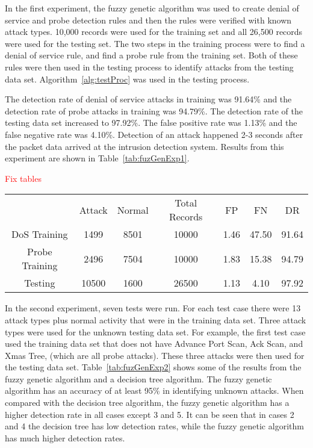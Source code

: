 \documentclass{sig-alternate}
\newcommand{\mycomment}[1]{\textcolor{red}{#1}}
\begin{document}
In the first experiment, the fuzzy genetic algorithm was used to create denial of service and probe detection rules and then the rules were verified with known attack types. 10,000 records were used for the training set and all 26,500 records were used for the testing set. The two steps in the training process were to find a denial of service rule, and find a probe rule from the training set. Both of these rules were then used in the testing process to identify attacks from the testing data set. Algorithm~\ref{alg:testProc} was used in the testing process.

\begin{algorithm}
\caption{}
\label{alg:testProc}
\begin{algorithmic}
\ELSE {}
\ENDIF
\end{algorithmic}
\end{algorithm}

The detection rate of denial of service attacks in training was 91.64\% and the detection rate of probe attacks in training was 94.79\%. The detection rate of the testing data set increased to 97.92\%. The false positive rate was 1.13\% and the false negative rate was 4.10\%. Detection of an attack happened 2-3 seconds after the packet data arrived at the intrusion detection system. Results from this experiment are shown in Table~\ref{tab:fuzGenExp1}.

\mycomment{Fix tables}

\begin{table*}
\caption{Results from Experiment 1}
\begin{tabular}{|ccccccc|} \hline
 & Attack & Normal & Total Records & FP & FN & DR\\
DoS Training & 1499 & 8501 & 10000 & 1.46 & 47.50 & 91.64\\
Probe Training & 2496 & 7504 & 10000 & 1.83 & 15.38 & 94.79\\
Testing & 10500 & 1600 & 26500 & 1.13 & 4.10 & 97.92\\
\hline\end{tabular}
\label{tab:fuzGenExp1}
\end{table*}

In the second experiment, seven tests were run. For each test case there were 13 attack types plus normal activity that were in the training data set. Three attack types were used for the unknown testing data set. For example, the first test case used the training data set that does not have Advance Port Scan, Ack Scan, and Xmas Tree, (which are all probe attacks). These three attacks were then used for the testing data set. Table~\ref{tab:fuzGenExp2} shows some of the results from the fuzzy genetic algorithm and a decision tree algorithm. The fuzzy genetic algorithm has an accuracy of at least 95\% in identifying unknown attacks. When compared with the decision tree algorithm, the fuzzy genetic algorithm has a higher detection rate in all cases except 3 and 5. It can be seen that in cases 2 and 4 the decision tree has low detection rates, while the fuzzy genetic algorithm has much higher detection rates.
\end{document}
